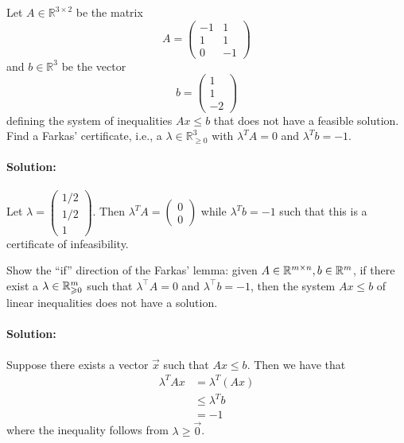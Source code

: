 \documentclass[11pt]{article}
\begin{document}
  Let $A ∈ ℝ^{3 ×2}$ be the matrix
  \begin{displaymath}
    A =
    \begin{pmatrix}
      -1 & 1 \\
      1 & 1 \\
      0 & -1 
    \end{pmatrix}
  \end{displaymath}
  and $b ∈ ℝ^3$ be the vector
  \begin{displaymath}
    b =
    \begin{pmatrix}
      1 \\ 1 \\ -2
    \end{pmatrix}
  \end{displaymath}
defining the system of inequalities $Ax ≤b$ that does not have a feasible solution. Find a Farkas' certificate, i.e., a  $λ ∈ ℝ^3_{≥0}$ with $λ^TA = 0$ and $λ^T b = -1$. 

\paragraph{Solution:}

Let $\lambda = \begin{pmatrix} 1/2 \\ 1/2 \\ 1 \end{pmatrix}$. Then $\lambda^TA = \begin{pmatrix} 0 \\ 0 \end{pmatrix}$ while $\lambda^Tb = -1$ such that this is a certificate of infeasibility. 


  

 \problem Show the ``if'' direction of the Farkas' lemma: given $A\in \mathbb{R}^{m\times n}, b\in \mathbb{R}^m$, if there exist a $\lambda \in \mathbb{R}^m_{\geqslant 0}$ such that $\lambda^\top A=0$ and $\lambda^\top b=-1$, then the system $Ax\leq b$ of linear inequalities does not have a solution. 
 
 \paragraph{Solution:}

Suppose there exists a vector $\vec{x}$ such that $Ax \leq b$. Then we have that 
\begin{align*}
\lambda^TAx & = \lambda^T(Ax) \\
&\leq \lambda^T b \\
& = -1 
\end{align*}
where the inequality follows from $\lambda \geq \vec{0}$.
\end{document}
